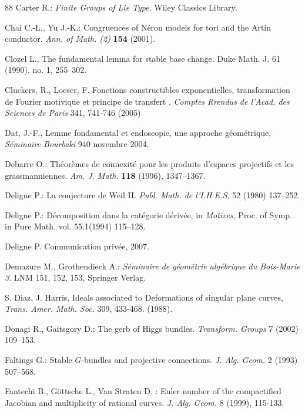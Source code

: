 \documentclass[12pt,english]{smfart}
\numberwithin{equation}{subsection}
\theoremstyle{remark}
\begin{document}
\begin{thebibliography}{88}
 Carter R.: {\em Finite Groups of Lie Type}. Wiley Classics Library.

Chai C.-L., Yu J.-K.: {Congruences of N\'eron models for tori and the Artin
    conductor}. {\em Ann. of Math. (2)} {\bf 154} (2001).

 Clozel L., {The fundamental lemma for stable base
change.} Duke Math. J. 61 (1990), no. 1, 255--302.

 Cluckers, R., Loeser, F. {Fonctions constructibles
    exponentielles, transformation de Fourier motivique et principe de
    transfert} . {\em Comptes Rrendus de l'Acad. des Sciences de Paris} 341,
    741-746 (2005)

 Dat, J.-F., {Lemme fondamental et endoscopie, une approche
    g\'eom\'etrique}, \emph{S\'eminaire Bourbaki} 940 novembre
    2004.

 Debarre O.: {Th\'eor\`emes de connexit\'e pour les produits
    d'espaces projectifs et les grassmanniennes}. {\em Am. J. Math.} {\bf 118}
    (1996), 1347--1367.

 Deligne P.: {La conjecture de Weil II}. {\em Publ. Math. de
l'I.H.E.S.} 52 (1980) 137--252.

 Deligne P.: {D\'ecomposition dans la cat\'egorie d\'eriv\'ee},
    in    {\em Motives}, Proc. of Symp. in Pure Math. vol. 55.1(1994) 115--128.

 Deligne P. Communication priv\'ee, 2007.

Demazure M., Grothendieck A.: {\em S\'eminaire de g\'eom\'etrie alg\'ebrique du
    Bois-Marie 3}. {\rm LNM} 151, 152, 153, Springer Verlag.

 S. Diaz, J. Harris, {Ideals associated to Deformations of singular
plane curves}, {\em Trans. Amer. Math. Soc.} 309, 433-468. (1988).

 Donagi R., Gaitsgory D.: {The gerb of Higgs bundles}. {\em
    Transform. Groups} 7 (2002) 109--153.

 Faltings G.: {Stable $G$-bundles and
projective connections}. {\em J. Alg. Geom.} 2 (1993) 507--568.

 Fantechi B., G\"{o}ttsche L., Van Straten D. :
{Euler number of the compactified Jacobian and multiplicity of
rational curves}. {\em J. Alg. Geom.} 8 (1999), 115-133.


\end{thebibliography}
\end{document}
